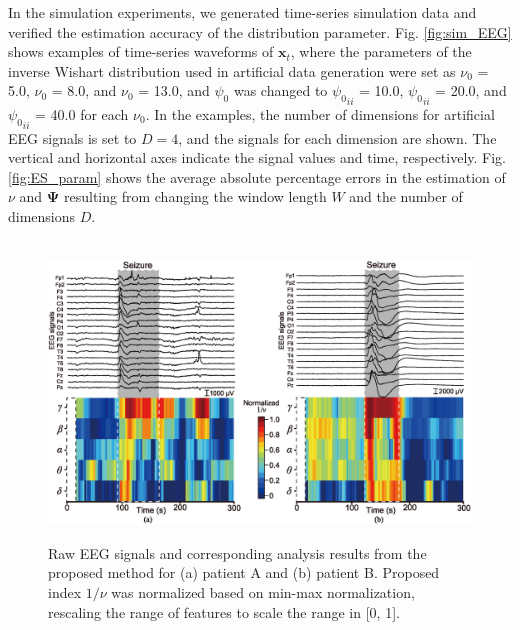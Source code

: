 \documentclass[journal]{IEEEtran}
\begin{document}
In the simulation experiments, we generated time-series simulation data and verified the estimation accuracy of the distribution parameter.
Fig. \ref{fig:sim_EEG} shows examples of time-series waveforms of $\mathbf{x}_t$, where the parameters of the inverse Wishart distribution used in artificial data generation were set as $\nu_0$ = 5.0, $\nu_0$ = 8.0, and $\nu_0$ = 13.0, and ${\psi_0}$ was changed to ${\psi_0}_{ii}$ = 10.0, ${\psi_0}_{ii}$ = 20.0, and ${\psi_0}_{ii}$ = 40.0 for each $\nu_0$.
In the examples, the number of dimensions for artificial EEG signals is set to $D = 4$, and the signals for each dimension are shown.
The vertical and horizontal axes indicate the signal values and time, respectively. 
Fig. \ref{fig:ES_param} shows the average absolute percentage errors in the estimation of $\nu$ and $\mathbf{\Psi}$ resulting from changing the window length $W$ and the number of dimensions $D$.


\begin{figure}[!ht]　%
\centering
\includegraphics[width=0.9\hsize]{figure/Colormap_ver4_5.eps}
\caption{Raw EEG signals and corresponding analysis results from the proposed method for (a) patient A and (b) patient B.
Proposed index $1/\nu$ was normalized based on min-max normalization, rescaling the range of features to scale the range in [0, 1].  }
\label{fig:Colormap}
\end{figure}
\end{document}
